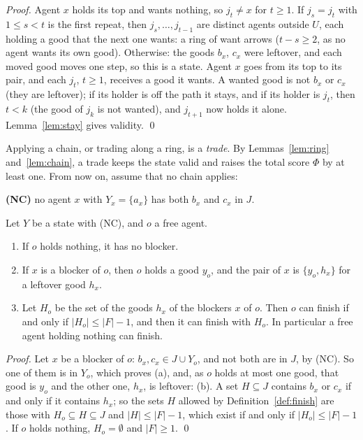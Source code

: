 \documentclass[runningheads,11pt]{llncs}
\begin{document}
\begin{proof}
Agent $x$ holds its top and wants nothing, so $j_t\ne x$ for $t\ge1$. If $j_s=j_t$ with $1\le s<t$ is the first repeat, then $j_s,\dots,j_{t-1}$ are distinct agents outside $U$, each holding a good that the next one wants: a ring of want arrows ($t-s\ge2$, as no agent wants its own good). Otherwise: the goods $b_x$, $c_x$ were leftover, and each moved good moves one step, so this is a state. Agent $x$ goes from its top to its pair, and each $j_t$, $t\ge1$, receives a good it wants. A wanted good is not $b_x$ or $c_x$ (they are leftover); if its holder is off the path it stays, and if its holder is $j_t$, then $t<k$ (the good of $j_k$ is not wanted), and $j_{t+1}$ now holds it alone. Lemma~\ref{lem:stay} gives validity. \qed
\end{proof}

\noindent Applying a chain, or trading along a ring, is a \emph{trade}. By Lemmas~\ref{lem:ring} and~\ref{lem:chain}, a trade keeps the state valid and raises the total score $\Phi$ by at least one. From now on, assume that no chain applies:

\smallskip
\noindent\textbf{(NC)} no agent $x$ with $Y_x=\{a_x\}$ has both $b_x$ and $c_x$ in $J$.
\smallskip

\begin{lemma}\label{lem:test}
Let $Y$ be a state with (NC), and $o$ a free agent.
\begin{enumerate}
\item[(a)] If $o$ holds nothing, it has no blocker.
\item[(b)] If $x$ is a blocker of $o$, then $o$ holds a good $y_o$, and the pair of $x$ is $\{y_o,h_x\}$ for a leftover good $h_x$.
\item[(c)] Let $H_o$ be the set of the goods $h_x$ of the blockers $x$ of $o$. Then $o$ can finish if and only if $|H_o|\le|F|-1$, and then it can finish with $H_o$. In particular a free agent holding nothing can finish.
\end{enumerate}
\end{lemma}

\begin{proof}
Let $x$ be a blocker of $o$: $b_x,c_x\in J\cup Y_o$, and not both are in $J$, by (NC). So one of them is in $Y_o$, which proves (a), and, as $o$ holds at most one good, that good is $y_o$ and the other one, $h_x$, is leftover: (b). A set $H\subseteq J$ contains $b_x$ or $c_x$ if and only if it contains $h_x$; so the sets $H$ allowed by Definition~\ref{def:finish} are those with $H_o\subseteq H\subseteq J$ and $|H|\le|F|-1$, which exist if and only if $|H_o|\le|F|-1$. If $o$ holds nothing, $H_o=\emptyset$ and $|F|\ge1$. \qed
\end{proof}
\end{document}

